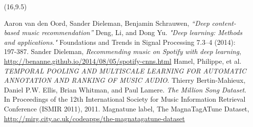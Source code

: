 \documentclass[a0]{a0poster}
\begin{document}
  \begin{textblock}{7}(16,9.5)
    \begin{thebibliography}{9}
      \sf
        Aaron van den Oord, Sander Dieleman, Benjamin Schrauwen, \emph{``Deep
        content-based music recommendation''}
        Deng, Li, and Dong Yu. \emph{"Deep learning: Methods and applications."}
        Foundations and Trends in Signal Processing 7.3–4 (2014): 197-387.
        Sander Dieleman, \emph{Recommending music on Spotify with deep learning},
        \url{http://benanne.github.io/2014/08/05/spotify-cnns.html}
        Hamel, Philippe, et al. \emph{TEMPORAL POOLING AND MULTISCALE LEARNING
        FOR AUTOMATIC ANNOTATION AND RANKING OF MUSIC AUDIO}.
        Thierry Bertin-Mahieux, Daniel P.W. Ellis, Brian Whitman, and Paul
        Lamere. \emph{The Million Song Dataset}. In Proceedings of the 12th
        International Society for Music Information Retrieval Conference (ISMIR
        2011), 2011.
        Magnatune label, The MagnaTagATune Dataset, \url{
        http://mirg.city.ac.uk/codeapps/the-magnatagatune-dataset}
    \end{thebibliography}
  \end{textblock}
\end{document}
